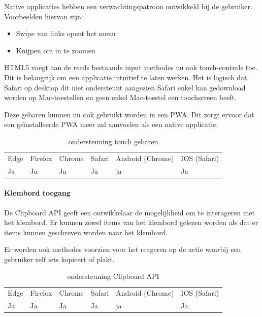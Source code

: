 Native applicaties hebben een verwachtingspatroon ontwikkeld bij de gebruiker. Voorbeelden hiervan zijn:

 \begin{itemize}
	\item	Swipe van links opent het menu
	\item	Knijpen om in te zoomen
\end{itemize}

HTML5 voegt aan de reeds bestaande input methodes nu ook touch-controls toe. Dit is belangrijk om een applicatie intuïtief te laten werken. Het is logisch dat Safari op desktop dit niet ondersteunt aangezien Safari enkel kan gedownload worden op Mac-toestellen en geen enkel Mac-toestel een touchscreen heeft.

Deze gebaren kunnen nu ook gebruikt worden in een PWA. Dit zorgt ervoor dat een geïnstalleerde PWA meer zal aanvoelen als een native applicatie.

\begin{table}[H]
	\centering
	\begin{tabular}{llllll}
		Edge & Firefox & Chrome & Safari & Android (Chrome) & IOS (Safari) \\
		Ja   & Ja      &  Ja     & Ja     & ja               & Ja          
	\end{tabular}	
	\caption{ondersteuning touch gebaren}
\end{table}	

\paragraph{Klembord toegang}
De Clipboard API \autocite{Kacmarcik2020} geeft een ontwikkelaar de mogelijkheid om te interageren met het klembord. Er kunnen zowel items van het klembord gelezen worden als dat er items kunnen geschreven worden naar het klembord.

Er worden ook methodes voorzien voor het reageren op de actie waarbij een gebruiker zelf iets kopieert of plakt. 

\begin{table}[H]
	\centering
	\begin{tabular}{llllll}
		Edge & Firefox & Chrome & Safari & Android (Chrome) & IOS (Safari) \\
		Ja   & Ja      &  Ja     & Ja     & ja               & Ja          
	\end{tabular}	
	\caption{ondersteuning Clipboard API}
\end{table}	


